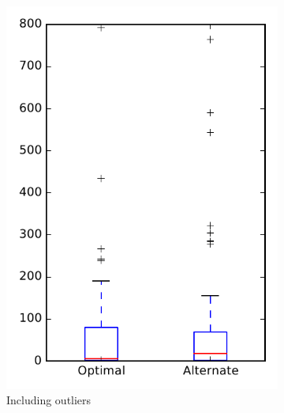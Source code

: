 
\begin{figure}
    \centering
    \begin{subfigure}{.4\textwidth}
        \centering
        \includegraphics[height=0.4\textheight]{figures/combo/flt_rq2_mahout}
        \caption{Including outliers}\label{fig:combo:flt:rq2:mahout_outlier}
    \end{subfigure}%
    \begin{subfigure}{.4\textwidth}
        \centering

\end{subfigure}
\end{figure}
